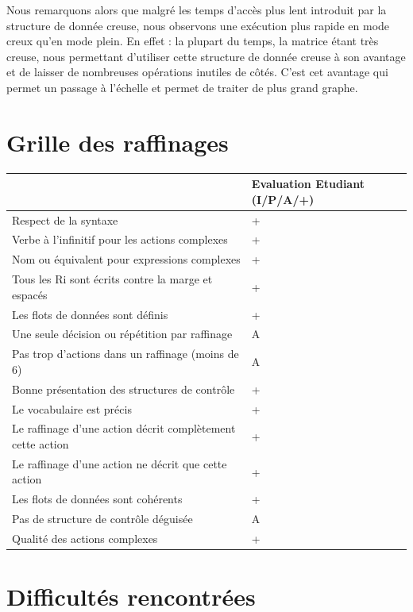 \documentclass{NewTeX}
\begin{document}
Nous remarquons alors que malgré les temps d'accès plus lent introduit par la structure de donnée creuse, nous observons une exécution plus rapide en mode creux qu'en mode plein. En effet : la plupart du temps, la matrice étant très creuse, nous permettant d'utiliser cette structure de donnée creuse à son avantage et de laisser de nombreuses opérations inutiles de côtés. C'est cet avantage qui permet un passage à l'échelle et permet de traiter de plus grand graphe.

\section{Grille des raffinages}

\begin{table}[!ht]
    \centering
    \begin{tabular}{|l|l|}
    \hline
        ~ & Evaluation Etudiant (I/P/A/+) \\ \hline
        Respect de la syntaxe & + \\ \hline
        Verbe à l'infinitif pour les actions complexes & + \\ \hline
        Nom ou équivalent pour expressions complexes & + \\ \hline
        Tous les Ri sont écrits contre la marge et espacés & + \\ \hline
        Les flots de données sont définis & + \\ \hline
        Une seule décision ou répétition par raffinage & A \\ \hline
        Pas trop d'actions dans un raffinage (moins de 6) & A \\ \hline
        Bonne présentation des structures de contrôle & + \\ \hline
        Le vocabulaire est précis & + \\ \hline
        Le raffinage d'une action décrit complètement cette action & + \\ \hline
        Le raffinage d'une action ne décrit que cette action & + \\ \hline
        Les flots de données sont cohérents & + \\ \hline
        Pas de structure de contrôle déguisée & A \\ \hline
        Qualité des actions complexes & + \\ \hline
    \end{tabular}
\end{table}

\section{Difficultés rencontrées}
\end{document}
